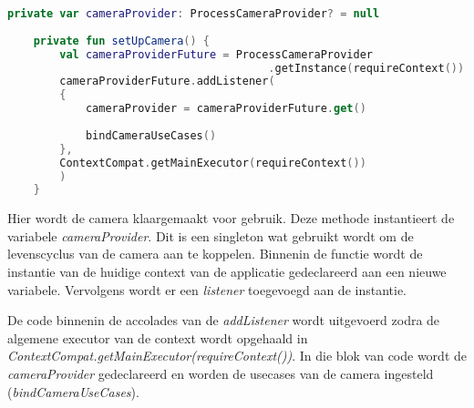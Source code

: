 \begin{lstlisting}[language=Kotlin, caption=setUpCamera in CameraFragment.kt, label={lst:setUpCamera}]
    private var cameraProvider: ProcessCameraProvider? = null
    
    private fun setUpCamera() {
        val cameraProviderFuture = ProcessCameraProvider
                                        .getInstance(requireContext())
        cameraProviderFuture.addListener(
        {
            cameraProvider = cameraProviderFuture.get()
            
            bindCameraUseCases()
        },
        ContextCompat.getMainExecutor(requireContext())
        )
    }
\end{lstlisting}
Hier wordt de camera klaargemaakt voor gebruik. Deze methode instantieert de variabele \emph{cameraProvider}. Dit is een singleton wat gebruikt wordt om de levenscyclus van de camera aan te koppelen. Binnenin de functie wordt de instantie van de huidige context van de applicatie gedeclareerd aan een nieuwe variabele. Vervolgens wordt er een \emph{listener} toegevoegd aan de instantie.

De code binnenin de accolades van de \emph{addListener} wordt uitgevoerd zodra de algemene executor van de context wordt opgehaald in \emph{ContextCompat.getMainExecutor(requireContext())}. In die blok van code wordt de \emph{cameraProvider} gedeclareerd en worden de usecases van de camera ingesteld (\emph{bindCameraUseCases}).

